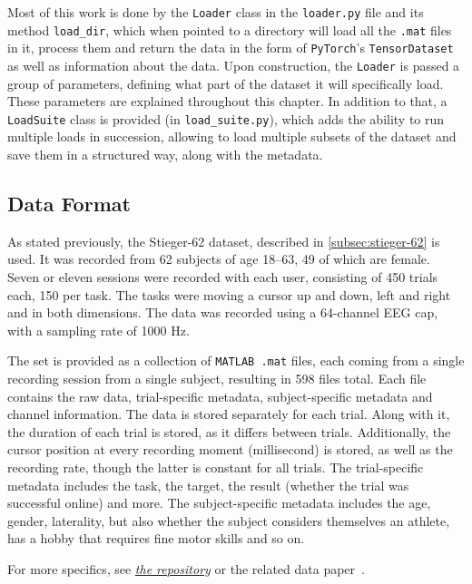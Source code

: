 \documentclass[english, he, bc, kiv, iso690alph, viewonly]{fasthesis}
\begin{document}
Most of this work is done by the \texttt{Loader} class in the \texttt{loader.py} file and its method \texttt{load\_dir}, which when pointed to a directory will load all the \texttt{.mat} files in it, process them and return the data in the form of \texttt{PyTorch}'s \texttt{TensorDataset} as well as information about the data. Upon construction, the \texttt{Loader} is passed a group of parameters, defining what part of the dataset it will specifically load. These parameters are explained throughout this chapter. In addition to that, a \texttt{LoadSuite} class is provided (in \texttt{load\_suite.py}), which adds the ability to run multiple loads in succession, allowing to load multiple subsets of the dataset and save them in a structured way, along with the metadata.

\subsection{Data Format}

As stated previously, the Stieger-62 dataset, described in \ref{subsec:stieger-62} is used. It was recorded from 62 subjects of age 18--63, 49 of which are female. Seven or eleven sessions were recorded with each user, consisting of 450 trials each, 150 per task. The tasks were moving a cursor up and down, left and right and in both dimensions. The data was recorded using a 64-channel EEG cap, with a sampling rate of 1000 Hz.

The set is provided as a collection of \texttt{MATLAB .mat} files, each coming from a single recording session from a single subject, resulting in 598 files total. Each file contains the raw data, trial-specific metadata, subject-specific metadata and channel information.
The data is stored separately for each trial. Along with it, the duration of each trial is stored, as it differs between trials. Additionally, the cursor position at every recording moment (millisecond) is stored, as well as the recording rate, though the latter is constant for all trials.
The trial-specific metadata includes the task, the target, the result (whether the trial was successful online) and more.
The subject-specific metadata includes the age, gender, laterality, but also whether the subject considers themselves an athlete, has a hobby that requires fine motor skills and so on.

For more specifics, see \href{https://figshare.com/articles/dataset/Human_EEG_Dataset_for_Brain-Computer_Interface_and_Meditation/13123148?file=25302482}{\textit{the repository}} or the related data paper~\cite{data:stieger:21}.
\end{document}
